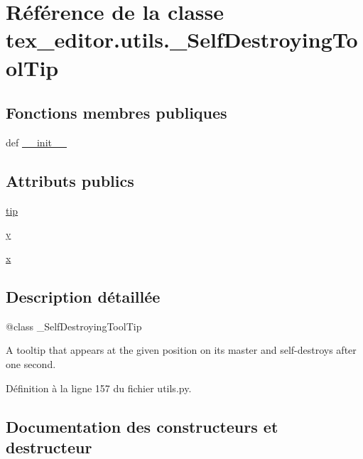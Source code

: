 \hypertarget{classtex__editor_1_1utils_1_1___self_destroying_tool_tip}{}\section{Référence de la classe tex\+\_\+editor.\+utils.\+\_\+\+Self\+Destroying\+Tool\+Tip}
\label{classtex__editor_1_1utils_1_1___self_destroying_tool_tip}
\subsection*{Fonctions membres publiques}
\begin{DoxyCompactItemize}
\item 
def \hyperlink{classtex__editor_1_1utils_1_1___self_destroying_tool_tip_aeab22f9ddb9c3a56585902b26a2b71db}{\+\_\+\+\_\+init\+\_\+\+\_\+}
\end{DoxyCompactItemize}
\subsection*{Attributs publics}
\begin{DoxyCompactItemize}
\item 
\hyperlink{classtex__editor_1_1utils_1_1___self_destroying_tool_tip_abcadcd596a0f435339cea75f0ad5a77e}{tip}
\item 
\hyperlink{classtex__editor_1_1utils_1_1___self_destroying_tool_tip_a6f144a252850868a9a2d79c2e0e6076e}{y}
\item 
\hyperlink{classtex__editor_1_1utils_1_1___self_destroying_tool_tip_af2e6ed687659722eb809706a826755ab}{x}
\end{DoxyCompactItemize}


\subsection{Description détaillée}
\begin{DoxyVerb}@class _SelfDestroyingToolTip

A tooltip that appears at the given position on its master
and self-destroys after one second.
\end{DoxyVerb}
 

Définition à la ligne 157 du fichier utils.\+py.



\subsection{Documentation des constructeurs et destructeur}
\hypertarget{classtex__editor_1_1utils_1_1___self_destroying_tool_tip_aeab22f9ddb9c3a56585902b26a2b71db}{}
